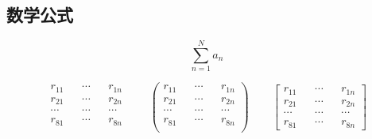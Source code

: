 \documentclass[withoutpreface,bwprint]{cumcmthesis} %
\begin{document}
\begin{appendices}
\section{数学公式}
\begin{equation}
    \sum\limits_{n=1}^Na_n
\end{equation}


\begin{equation}
    \begin{matrix} 
        r_{11}  &&    \cdots  &&  r_{1n}  \\
        r_{21}  &&  \cdots  &&  r_{2n}    \\ 
        \cdots  &&  \cdots  &&  \cdots    \\
        r_{81}  &&  \cdots  &&  r_{8n}    \\ 
    \end{matrix} 
    \quad\quad
    \begin{pmatrix} 
        r_{11}  &&  \cdots  &&  r_{1n}  \\
        r_{21}  &&  \cdots  &&  r_{2n}  \\ 
        \cdots  &&  \cdots  &&  \cdots  \\
        r_{81}  &&  \cdots  &&  r_{8n}  \\ 
    \end{pmatrix} 
    \quad\quad
    \begin{bmatrix} 
        r_{11}  &&  \cdots  &&  r_{1n}  \\
        r_{21}  &&  \cdots  &&  r_{2n}  \\ 
        \cdots  &&  \cdots  &&  \cdots  \\
        r_{81}  &&  \cdots  &&  r_{8n}  
    \end{bmatrix} 
\end{equation}


\end{appendices}
\end{document}
